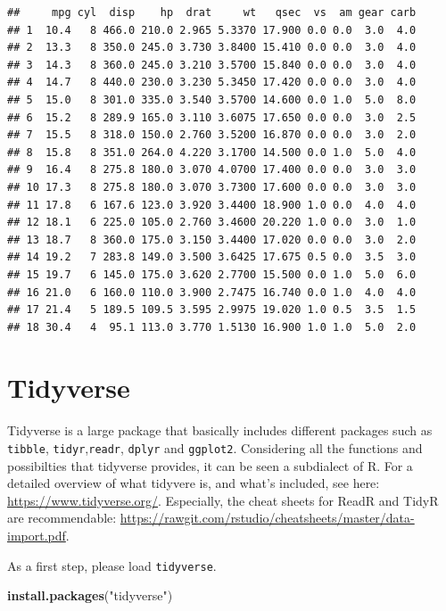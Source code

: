 \documentclass[]{report}
\newenvironment{Shaded}{\begin{snugshade}}{\end{snugshade}}
\newcommand{\KeywordTok}[1]{\textcolor[rgb]{0.13,0.29,0.53}{\textbf{#1}}}
\newcommand{\StringTok}[1]{\textcolor[rgb]{0.31,0.60,0.02}{#1}}
\newcommand{\NormalTok}[1]{#1}
\begin{document}
\begin{verbatim}
##     mpg cyl  disp    hp  drat     wt   qsec  vs  am gear carb
## 1  10.4   8 466.0 210.0 2.965 5.3370 17.900 0.0 0.0  3.0  4.0
## 2  13.3   8 350.0 245.0 3.730 3.8400 15.410 0.0 0.0  3.0  4.0
## 3  14.3   8 360.0 245.0 3.210 3.5700 15.840 0.0 0.0  3.0  4.0
## 4  14.7   8 440.0 230.0 3.230 5.3450 17.420 0.0 0.0  3.0  4.0
## 5  15.0   8 301.0 335.0 3.540 3.5700 14.600 0.0 1.0  5.0  8.0
## 6  15.2   8 289.9 165.0 3.110 3.6075 17.650 0.0 0.0  3.0  2.5
## 7  15.5   8 318.0 150.0 2.760 3.5200 16.870 0.0 0.0  3.0  2.0
## 8  15.8   8 351.0 264.0 4.220 3.1700 14.500 0.0 1.0  5.0  4.0
## 9  16.4   8 275.8 180.0 3.070 4.0700 17.400 0.0 0.0  3.0  3.0
## 10 17.3   8 275.8 180.0 3.070 3.7300 17.600 0.0 0.0  3.0  3.0
## 11 17.8   6 167.6 123.0 3.920 3.4400 18.900 1.0 0.0  4.0  4.0
## 12 18.1   6 225.0 105.0 2.760 3.4600 20.220 1.0 0.0  3.0  1.0
## 13 18.7   8 360.0 175.0 3.150 3.4400 17.020 0.0 0.0  3.0  2.0
## 14 19.2   7 283.8 149.0 3.500 3.6425 17.675 0.5 0.0  3.5  3.0
## 15 19.7   6 145.0 175.0 3.620 2.7700 15.500 0.0 1.0  5.0  6.0
## 16 21.0   6 160.0 110.0 3.900 2.7475 16.740 0.0 1.0  4.0  4.0
## 17 21.4   5 189.5 109.5 3.595 2.9975 19.020 1.0 0.5  3.5  1.5
## 18 30.4   4  95.1 113.0 3.770 1.5130 16.900 1.0 1.0  5.0  2.0
\end{verbatim}

\section{Tidyverse}\label{tidyverse}

Tidyverse is a large package that basically includes different packages
such as \texttt{tibble}, \texttt{tidyr},\texttt{readr}, \texttt{dplyr}
and \texttt{ggplot2}. Considering all the functions and possibilties
that tidyverse provides, it can be seen a subdialect of R. For a
detailed overview of what tidyvere is, and what's included, see here:
\url{https://www.tidyverse.org/}. Especially, the cheat sheets for ReadR
and TidyR are recommendable:
\url{https://rawgit.com/rstudio/cheatsheets/master/data-import.pdf}.

As a first step, please load \texttt{tidyverse}.

\begin{Shaded}
\begin{Highlighting}[]
\KeywordTok{install.packages}\NormalTok{(}\StringTok{"tidyverse"}\NormalTok{)}
\end{Highlighting}
\end{Shaded}
\end{document}
